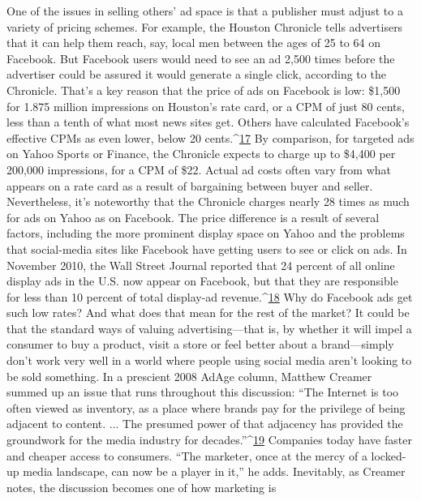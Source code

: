One of the issues in selling others' ad space is that a publisher must adjust to a
variety of pricing schemes. For example, the Houston Chronicle tells advertisers
that it can help them reach, say, local men between the ages of 25 to 64 on
Facebook. But Facebook users would need to see an ad 2,500 times before the
advertiser could be assured it would generate a single click, according to the
Chronicle. That's a key reason that the price of ads on Facebook is low: \$1,500
for 1.875 million impressions on Houston's rate card, or a CPM of just 80 cents,
less than a tenth of what most news sites get. Others have calculated Facebook's
effective CPMs as even lower, below 20 cents.^{\href{#endnotes-chapter-8}{17}} By comparison, for targeted ads
on Yahoo Sports or Finance, the Chronicle expects to charge up to \$4,400 per
200,000 impressions, for a CPM of \$22.
Actual ad costs often vary from what appears on a rate card as a result of bargaining
between buyer and seller. Nevertheless, it's noteworthy that the Chronicle
charges nearly 28 times as much for ads on Yahoo as on Facebook. The price difference
is a result of several factors, including the more prominent display space
on Yahoo and the problems that social-media sites like Facebook have getting
users to see or click on ads. In November 2010, the Wall Street Journal reported
that 24 percent of all online display ads in the U.S. now appear on Facebook, but
that they are responsible for less than 10 percent of total display-ad revenue.^{\href{#endnotes-chapter-8}{18}}
Why do Facebook ads get such low rates? And what does that mean for the rest
of the market? It could be that the standard ways of valuing advertising—that is,
by whether it will impel a consumer to buy a product, visit a store or feel better
about a brand—simply don't work very well in a world where people using
social media aren't looking to be sold something.
In a prescient 2008 AdAge column, Matthew Creamer summed up an issue
that runs throughout this discussion: ``The Internet is too often viewed as inventory,
as a place where brands pay for the privilege of being adjacent to content.
... The presumed power of that adjacency has provided the groundwork for the
media industry for decades.''^{\href{#endnotes-chapter-8}{19}} Companies today have faster and cheaper access
to consumers. ``The marketer, once at the mercy of a locked-up media landscape,
can now be a player in it,'' he adds.
Inevitably, as Creamer notes, the discussion becomes one of how marketing is
